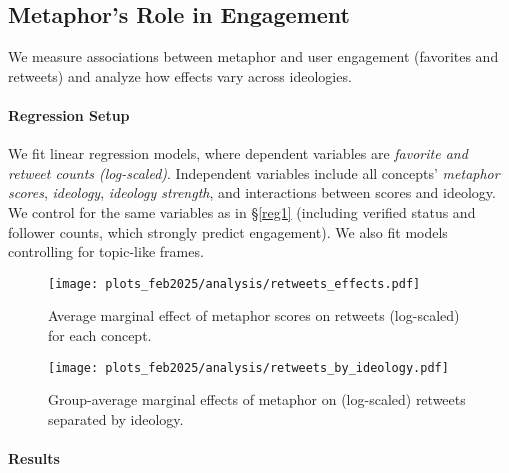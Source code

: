 \subsection{Metaphor's Role in Engagement}
\label{reg2}

We measure associations between metaphor and user engagement (favorites and retweets) and analyze how effects vary across ideologies.


\paragraph{Regression Setup} We fit linear regression models, where dependent variables are \textit{favorite and retweet counts (log-scaled)}. Independent variables include all concepts' \textit{metaphor scores}, \textit{ideology}, \textit{ideology strength}, and interactions between scores and ideology. We control for the same variables as in §\ref{reg1} (including verified status and follower counts, which strongly predict engagement). We also fit models controlling for topic-like frames. %



\begin{figure}[t!]
    \centering
    \texttt{[image: plots\_feb2025/analysis/retweets\_effects.pdf]}
    \caption{Average marginal effect of metaphor scores on retweets (log-scaled) for each concept.}
    \label{fig:retweet}
\end{figure}

\begin{figure}[t!]
    \centering
    \texttt{[image: plots\_feb2025/analysis/retweets\_by\_ideology.pdf]}
    \caption{Group-average marginal effects of metaphor on (log-scaled) retweets separated by ideology.}
    \label{fig:retweet_ideology}
\end{figure}





\paragraph{Results}


